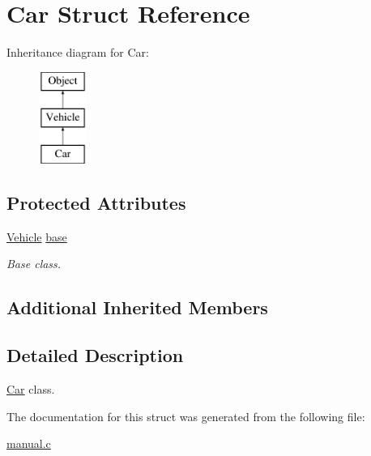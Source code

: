 \hypertarget{struct_car}{\section{Car Struct Reference}
\label{struct_car}
}
Inheritance diagram for Car\-:\begin{figure}[H]
\begin{center}
\leavevmode
\includegraphics[height=3.000000cm]{struct_car}
\end{center}
\end{figure}
\subsection*{Protected Attributes}
\begin{DoxyCompactItemize}
\item 
\hypertarget{struct_car_ab8ff28306286da5a8b14fa9bdccaafaa}{\hyperlink{struct_vehicle}{Vehicle} \hyperlink{struct_car_ab8ff28306286da5a8b14fa9bdccaafaa}{base}}\label{struct_car_ab8ff28306286da5a8b14fa9bdccaafaa}

\begin{DoxyCompactList}\small\item\em Base class. \end{DoxyCompactList}\end{DoxyCompactItemize}
\subsection*{Additional Inherited Members}


\subsection{Detailed Description}
\hyperlink{struct_car}{Car} class. 

The documentation for this struct was generated from the following file\-:\begin{DoxyCompactItemize}
\item 
\hyperlink{manual_8c}{manual.\-c}\end{DoxyCompactItemize}

